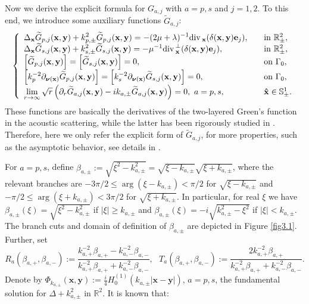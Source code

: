 \documentclass[final,reqno]{siamltex}
\newcommand{\pa}{\partial}
\newcommand{\dive}{{\rm div\,}}
\newcommand{\wid}{\widetilde}
\newcommand{\mat}{\mathbb}
\newcommand{\R}{{\mat R}}
\newcommand{\Sp}{{\mat S}}
\newcommand{\be}{\begin{eqnarray}}
\newcommand{\en}{\end{eqnarray}}
\begin{document}
Now we derive the explicit formula for $G_{a,j}$ with $a=p,s$ and $j=1,2$. To this end, we introduce some auxiliary functions $\wid{G}_{a,j}$: 
\be\label{3.3}
\left\{
\begin{array}{ll}
	\displaystyle\Delta_\mathbf{x}\wid G_{p,j}(\mathbf{x},\mathbf{y})+k_{p,\pm}^2\wid G_{p,j}(\mathbf{x},\mathbf{y})=-(2\mu+\lambda)^{-1}\dive_{\mathbf{x}}(\delta(\mathbf{x},\mathbf{y})\mathbf{e}_j),~~~&{\rm in}~\R^2_\pm,\\ 
	\displaystyle\Delta_\mathbf{x}\wid G_{s,j}(\mathbf{x},\mathbf{y})+k_{s,\pm}^2\wid G_{s,j}(\mathbf{x},\mathbf{y})=-\mu^{-1}\dive_{\mathbf{x}}^\perp(\delta(\mathbf{x},\mathbf{y})\mathbf{e}_j),~~~&{\rm in}~\R^2_\pm,\\
	\left[\wid G_{p,j}(\mathbf{x},\mathbf{y})\right]=\left[\wid G_{s,j}(\mathbf{x},\mathbf{y})\right]=0,~~~&{\rm on}~\Gamma_0, \\
	\displaystyle\left[k_p^{-2}\pa_{\boldsymbol{\nu}(\mathbf{x})}\wid G_{p,j}(\mathbf{x},\mathbf{y})\right]=\displaystyle\left[k_s^{-2}\pa_{\boldsymbol{\nu}(\mathbf{x})}\wid G_{s,j}(\mathbf{x},\mathbf{y})\right]=0,~~~&{\rm on}~\Gamma_0, \\ 
	\lim\limits_{r\rightarrow\infty}\sqrt{r}\left(\pa_r\wid G_{a,j}(\mathbf{x},\mathbf{y})-ik_{a,\pm}\wid G_{a,j}(\mathbf{x},\mathbf{y})\right)=0,~a=p,s,~~~&\mathbf{\hat x}\in\Sp^1_\pm. 
\end{array}
\right.
\en
These functions are basically the derivatives of the two-layered Green's function in the acoustic scattering, while the latter has been rigorously studied in \cite{HED05,CP17,LJ24}. Therefore, here we only refer the explicit form of $\wid G_{a,j}$, for more properties, such as the asymptotic behavior, see details in  \cite{HED05,CP17,LJ24}. 

For $a=p,s$, define $\beta_{a,\pm}:=\sqrt{\xi^2-k_{a,\pm}^2}=\sqrt{\xi-k_{a,\pm}}\sqrt{\xi+k_{a,\pm}}$, where the relevant branches are $-3\pi/2\leq\arg(\xi-k_{a,\pm})<\pi/2$ for $\sqrt{\xi-k_{a,\pm}}$ and $-\pi/2\leq\arg(\xi+k_{a,\pm})<3\pi/2$ for $\sqrt{\xi+k_{a,\pm}}$. In particular, for real $\xi$ we have $\beta_{a,\pm}(\xi)=\sqrt{\xi^2-k_{a,\pm}^2}$ if $|\xi|\geq k_{a,\pm}$ and $\beta_{a,\pm}(\xi)=-i\sqrt{k_{a,\pm}^2-\xi^2}$ if $|\xi|<k_{a,\pm}$. The branch cuts and domain of definition of $\beta_{a,\pm}$ are depicted in Figure \ref{fig3.1}. Further, set  
$$
R_a(\beta_{a,+},\beta_{a,-}):=\frac{k_{a,+}^{-2}\beta_{a,+}-k_{a,-}^{-2}\beta_{a,-}}{k_{a,+}^{-2}\beta_{a,+}+k_{a,-}^{-2}\beta_{a,-}},~~~
T_a(\beta_{a,+},\beta_{a,-}):=\frac{2k_{a,+}^{-2}\beta_{a,+}}{k_{a,+}^{-2}\beta_{a,+}+k_{a,-}^{-2}\beta_{a,-}}. 
$$
Denote by $\Phi_{k_{a,\pm}}(\mathbf{x},\mathbf{y}):=\frac{i}{4}H_0^{(1)}(k_{a,\pm}|\mathbf{x}-\mathbf{y}|)$, $a=p,s$,  the fundamental solution for $\Delta+k_{a,\pm}^2$ in $\R^2$. It is known that: 
\end{document}

